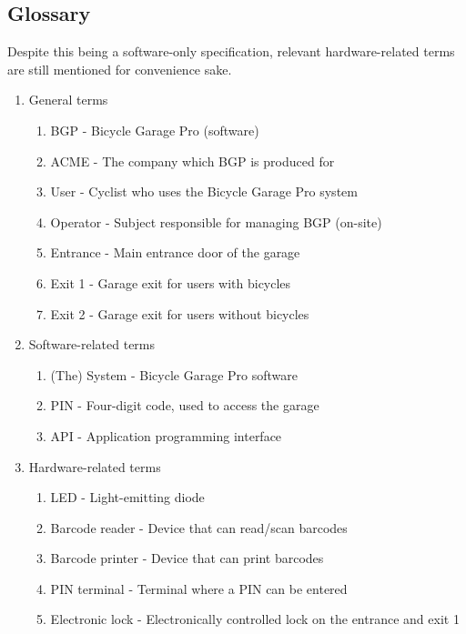 \documentclass[12pt,titlepage,bibliography=totoc]{article}
\begin{document}
\subsection{Glossary}
Despite this being a software-only specification, relevant hardware-related terms are still mentioned for convenience sake.
\begin{enumerate}
	\item General terms
	\begin{enumerate}
		\item BGP - Bicycle Garage Pro (software)
		\item ACME - The company which BGP is produced for
		\item User - Cyclist who uses the Bicycle Garage Pro system
		\item Operator - Subject responsible for managing BGP (on-site)
		\item Entrance - Main entrance door of the garage
		\item Exit 1 - Garage exit for users with bicycles
		\item Exit 2 - Garage exit for users without bicycles
	\end{enumerate}

	\item Software-related terms
	\begin{enumerate}
		\item (The) System - Bicycle Garage Pro software
		\item PIN - Four-digit code, used to access the garage
		\item API - Application programming interface
	\end{enumerate}

	\item Hardware-related terms
	\begin{enumerate}
		\item LED - Light-emitting diode
		\item Barcode reader - Device that can read/scan barcodes
		\item Barcode printer - Device that can print barcodes
		\item PIN terminal - Terminal where a PIN can be entered
		\item Electronic lock - Electronically controlled lock on the entrance and exit 1
	\end{enumerate}
\end{enumerate}
\end{document}
